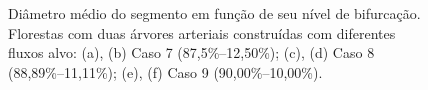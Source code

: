 \begin{figure}[!htb]
  \centering
  \captiondelim{: }
  \caption{Diâmetro médio do segmento em função de seu nível de bifurcação. 
  Florestas com duas árvores arteriais construídas com diferentes fluxos alvo: 
  (a), (b) Caso 7 (87,5\%--12,50\%); (c), (d) Caso 8 (88,89\%--11,11\%);  (e), (f) Caso 9 (90,00\%--10,00\%).}
  
  \hspace{12pt}


\end{figure}
